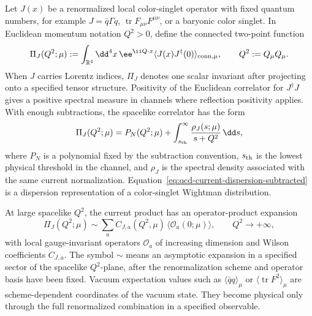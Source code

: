 Let \(J(x)\) be a renormalized local color-singlet operator with fixed
quantum numbers, for example \(J=\bar q\Gamma q\),
\(\operatorname{tr}F_{\mu\nu}F^{\mu\nu}\), or a baryonic color singlet.  In
Euclidean momentum notation \(Q^2>0\), define the connected two-point
function
\begin{equation}
  \Pi_J(Q^2;\mu)
  :=
  \int_{\mathbb R^4}\dd^4x\,
  \ee^{\ii Q\cdot x}
  \langle J(x)J^\dagger(0)\rangle_{\rm conn,\mu},
  \qquad Q^2:=Q_\mu Q_\mu .
  \label{eq:qcd-euclidean-current-correlator}
\end{equation}
When \(J\) carries Lorentz indices, \(\Pi_J\) denotes one scalar invariant
after projecting onto a specified tensor structure.  Positivity of the
Euclidean correlator for \(J^\dagger J\) gives a positive spectral measure in
channels where reflection positivity applies.  With enough subtractions, the
spacelike correlator has the form
\begin{equation}
  \Pi_J(Q^2;\mu)
  =
  P_N(Q^2;\mu)
  +
  \int_{s_{\rm th}}^\infty
  \frac{\rho_J(s;\mu)}{s+Q^2}\,\dd s ,
  \label{eq:qcd-current-dispersion-subtracted}
\end{equation}
where \(P_N\) is a polynomial fixed by the subtraction convention,
\(s_{\rm th}\) is the lowest physical threshold in the channel, and
\(\rho_J\) is the spectral density associated with the same current
normalization.  Equation~\eqref{eq:qcd-current-dispersion-subtracted} is a
dispersion representation of a color-singlet Wightman distribution.

At large spacelike \(Q^2\), the current product has an operator-product
expansion
\begin{equation}
  \Pi_J(Q^2;\mu)
  \sim
  \sum_a C_{J,a}(Q^2,\mu)\,
  \langle \mathcal O_a(0;\mu)\rangle ,
  \qquad Q^2\to+\infty ,
  \label{eq:qcd-current-correlator-ope}
\end{equation}
with local gauge-invariant operators \(\mathcal O_a\) of increasing dimension
and Wilson coefficients \(C_{J,a}\).  The symbol \(\sim\) means an asymptotic
expansion in a specified sector of the spacelike \(Q^2\)-plane, after the
renormalization scheme and operator basis have been fixed.  Vacuum
expectation values such as \(\langle\bar q q\rangle_\mu\) or
\(\langle\operatorname{tr}F^2\rangle_\mu\) are scheme-dependent coordinates of
the vacuum state.  They become physical only through the full renormalized
combination in a specified observable.


